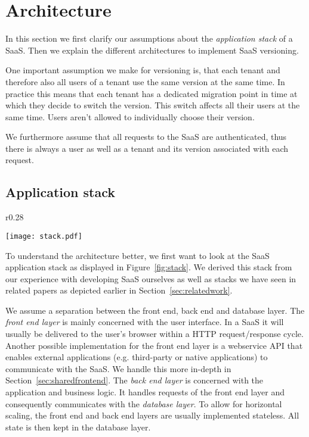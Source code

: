 
\section{Architecture}
\label{sec:architecture}

In this section we first clarify our assumptions about the \emph{application stack} of a SaaS. Then we explain the different architectures to implement  SaaS versioning.

One important assumption we make for versioning is, that each tenant and therefore also all users of a tenant use the same version at the same time. In practice this means that each tenant has a dedicated migration point in time at which they decide to switch the version. This switch affects all their users at the same time. Users aren't allowed to individually choose their version.

We furthermore assume that all requests to the SaaS are authenticated, thus there is always a user as well as a tenant and its version associated with each request.

\subsection{Application stack}
\label{sec:stack}

\begin{wrapfigure}{r}{0.28\textwidth}
  \begin{center}
    \texttt{[image: stack.pdf]}
    \caption{Simplified \protect\\ Application Stack}
    \vspace{-20pt}
    \label{fig:stack}
  \end{center}
\end{wrapfigure}


To understand the architecture better, we first want to look at the SaaS application stack as displayed in Figure~\ref{fig:stack}. We derived this stack from our experience with developing SaaS ourselves as well as stacks we have seen in related papers as depicted earlier in Section~\ref{sec:relatedwork}.

We assume a separation between the front end, back end and database layer. The \emph{front end layer} is mainly concerned with the user interface. In a SaaS it will usually be delivered to the user's browser within a HTTP request/response cycle. Another possible implementation for the front end layer is a webservice API that enables external applications (e.g. third-party or native applications) to communicate with the SaaS. We handle this more in-depth in Section~\ref{sec:sharedfrontend}. The \emph{back end layer} is concerned with the application and business logic. It handles requests of the front end layer and consequently communicates with the \emph{database layer}. To allow for horizontal scaling, the front end and back end layers are usually implemented stateless. All state is then kept in the database layer.

